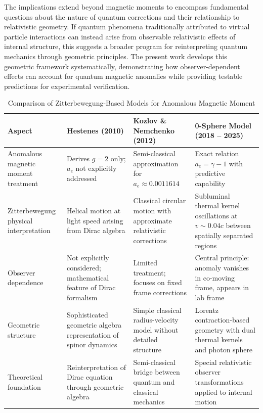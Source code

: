 \documentclass[%
 reprint,
 amsmath,amssymb,
 aps,
]{revtex4-1}
\numberwithin{equation}{section}%
\begin{document}
The implications extend beyond magnetic moments to encompass fundamental questions about the nature of quantum corrections and their relationship to relativistic geometry. If quantum phenomena traditionally attributed to virtual particle interactions can instead arise from observable relativistic effects of internal structure, this suggests a broader program for reinterpreting quantum mechanics through geometric principles. The present work develops this geometric framework systematically, demonstrating how observer-dependent effects can account for quantum magnetic anomalies while providing testable predictions for experimental verification.

\clearpage

\begin{table}[t!]
\caption{Comparison of Zitterbewegung-Based Models for Anomalous Magnetic Moment}
\label{tab:zb_comparison}
\renewcommand{\arraystretch}{1.4}
\begin{tabular}{p{4.2cm}p{4.0cm}p{4.0cm}p{4.0cm}}
\toprule
\textbf{Aspect} & \textbf{Hestenes (2010)} & \textbf{Kozlov \& Nemchenko (2012)} & \textbf{0-Sphere Model (2018 -- 2025)} \\
\midrule
Anomalous magnetic moment treatment & Derives $g = 2$ only; $a_e$ not explicitly addressed & Semi-classical approximation for $a_e \approx 0.0011614$ & Exact relation $a_e = \gamma - 1$ with predictive capability \\
\addlinespace[0.3cm]
Zitterbewegung physical interpretation & Helical motion at light speed arising from Dirac algebra & Classical circular motion with approximate relativistic corrections & Subluminal thermal kernel oscillations at $v \sim 0.04c$ between spatially separated regions \\
\addlinespace[0.3cm]
Observer dependence & Not explicitly considered; mathematical feature of Dirac formalism & Limited treatment; focuses on fixed frame corrections & Central principle: anomaly vanishes in co-moving frame, appears in lab frame \\
\addlinespace[0.3cm]
Geometric structure & Sophisticated geometric algebra representation of spinor dynamics & Simple classical radius-velocity model without detailed structure & Lorentz contraction-based geometry with dual thermal kernels and photon sphere \\
\addlinespace[0.3cm]
Theoretical foundation & Reinterpretation of Dirac equation through geometric algebra & Semi-classical bridge between quantum and classical mechanics & Special relativistic observer transformations applied to internal motion \\

\end{tabular}
\end{table}
\end{document}

